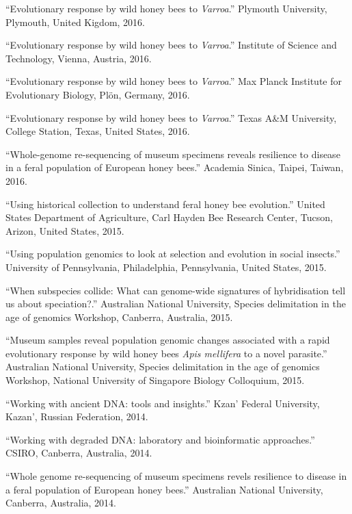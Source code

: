 \documentclass[11pt]{article}
\def\printdate#1{\xprintdate#1-}
\def\xprintdate#1-#2-#3-{#1}
\begin{document}
\ind ``Evolutionary response by wild honey bees to \textit{Varroa}.'' Plymouth University, Plymouth, United Kigdom, \printdate{2016-00-00}.


\ind ``Evolutionary response by wild honey bees to \textit{Varroa}.'' Institute of Science and Technology, Vienna, Austria, \printdate{2016-00-00}.


\ind ``Evolutionary response by wild honey bees to \textit{Varroa}.'' Max Planck Institute for Evolutionary Biology, Plön, Germany, \printdate{2016-00-00}.


\ind ``Evolutionary response by wild honey bees to \textit{Varroa}.'' Texas A\&M University, College Station, Texas, United States, \printdate{2016-00-00}.


\ind ``Whole-genome re-sequencing of museum specimens reveals resilience to
disease in a feral population of European honey bees.'' Academia Sinica, Taipei, Taiwan, \printdate{2016-00-00}.


\ind ``Using historical collection to understand feral honey bee evolution.'' United States Department of Agriculture, Carl Hayden Bee Research Center, Tucson, Arizon, United States, \printdate{2015-00-00}.


\ind ``Using population genomics to look at selection and evolution in social
insects.'' University of Pennsylvania, Philadelphia, Pennsylvania, United States, \printdate{2015-00-00}.


\ind ``When subspecies collide: What can genome-wide signatures of
hybridisation tell us about speciation?.'' Australian National University, Species delimitation in the age of
genomics Workshop, Canberra, Australia, \printdate{2015-00-00}.


\ind ``Museum samples reveal population genomic changes associated with a rapid
evolutionary response by wild honey bees \textit{Apis mellifera} to a
novel parasite.'' Australian National University, Species delimitation in the age of
genomics Workshop, National University of Singapore Biology Colloquium, \printdate{2015-00-00}.


\ind ``Working with ancient DNA: tools and insights.'' Kzan' Federal University, Kazan', Russian Federation, \printdate{2014-00-00}.


\ind ``Working with degraded DNA: laboratory and bioinformatic approaches.'' CSIRO, Canberra, Australia, \printdate{2014-00-00}.


\ind ``Whole genome re-sequencing of museum specimens revels resilience to
disease in a feral population of European honey bees.'' Australian National University, Canberra, Australia, \printdate{2014-00-00}.
\end{document}
